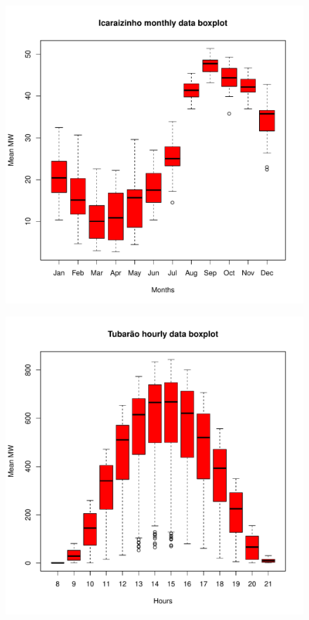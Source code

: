 \begin{figure}
  \centering
  \begin{minipage}[t]{\linewidth}

    \begin{minipage}[t]{0.45\linewidth}
       \includegraphics[width=\textwidth]{./Figuras/Icaraizinho/icaraizinho-boxplot}
      	\label{fig:icaraizinho-boxplot}
    \end{minipage}
    \begin{minipage}[t]{0.45\linewidth}
       \includegraphics[width=\textwidth]{./Figuras/Solar-exemplos/tubarao-boxplot}

\end{minipage}
\end{minipage}
\end{figure}
